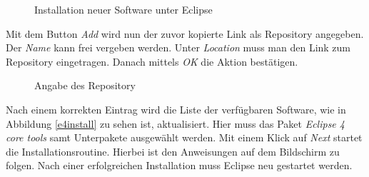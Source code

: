 \begin{figure}[H]
  \vspace{0.5cm}
  \centering
  \caption{Installation neuer Software unter Eclipse}
  \label{installnew}
  \vspace{0.5cm}
\end{figure}

Mit dem Button \textit{Add} wird nun der zuvor kopierte Link als Repository angegeben. Der \textit{Name} kann frei vergeben werden. Unter \textit{Location} muss man den Link zum Repository eingetragen. Danach mittels \textit{OK} die Aktion bestätigen.

\begin{figure}[H]
  \vspace{0.5cm}
  \centering
  \caption{Angabe des Repository}
  \label{insertrepo}
  \vspace{0.5cm}
\end{figure}

Nach einem korrekten Eintrag wird die Liste der verfügbaren Software, wie in Abbildung \ref{e4install} zu sehen ist, aktualisiert. Hier muss das Paket \textit{Eclipse 4 core tools} samt Unterpakete ausgewählt werden. Mit einem Klick auf \textit{Next} startet die Installationsroutine. Hierbei ist den Anweisungen auf dem Bildschirm zu folgen. Nach einer erfolgreichen Installation muss Eclipse neu gestartet werden.


